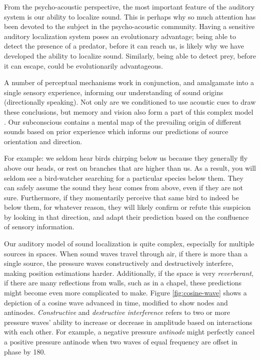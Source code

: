 From the psycho-acoustic perspective, the most important feature of the auditory system is our ability to localize sound. This is perhaps why so much attention has been devoted to the subject in the psycho-acoustic community. Having a sensitive auditory localization system poses an evolutionary advantage; being able to detect the presence of a predator, before it can reach us, is likely why we have developed the ability to localize sound. Similarly, being able to detect prey, before it can escape, could be evolutionarily advantageous. 

A number of perceptual mechanisms work in conjunction, and amalgamate into a single sensory experience, informing our understanding of sound origins (directionally speaking). Not only are we conditioned to use acoustic cues to draw these conclusions, but memory and vision also form a part of this complex model \cite{kendall19953}. Our subconscious contains a mental map of the prevailing origin of different sounds based on prior experience which informs our predictions of source orientation and direction. 

For example: we seldom hear birds chirping below us because they generally fly above our heads, or rest on branches that are higher than us. As a result, you will seldom see a bird-watcher searching for a particular species below them. They can safely assume the sound they hear comes from above, even if they are not sure. Furthermore, if they momentarily perceive that same bird to indeed be below them, for whatever reason, they will likely confirm or refute this suspicion by looking in that direction, and adapt their prediction based on the confluence of sensory information. 

Our auditory model of sound localization is quite complex, especially for multiple sources in spaces. When sound waves travel through air, if there is more than a single source, the pressure waves constructively and destructively interfere, making position estimations harder. Additionally, if the space is very \textit{reverberant}, if there are many reflections from walls, such as in a chapel, these predictions might become even more complicated to make. Figure \ref{fig:cosine-wave} shows a depiction of a cosine wave advanced in time, modified to show nodes and antinodes. \textit{Constructive} and \textit{destructive interference} refers to two or more pressure waves' ability to increase or decrease in amplitude based on interactions with each other. For example, a negative pressure \textit{antinode} might perfectly cancel a positive pressure antinode when two waves of equal frequency are offset in phase by 180\textdegree.

